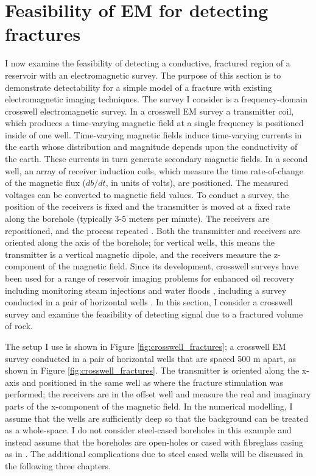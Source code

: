\section{Feasibility of EM for detecting fractures}
I now examine the feasibility of detecting a conductive, fractured region of a reservoir with an electromagnetic survey. The purpose of this section is to demonstrate detectability for a simple model of a fracture with existing electromagnetic imaging techniques. The survey I consider is a frequency-domain crosswell electromagnetic survey. In a crosswell EM survey a transmitter coil, which produces a time-varying magnetic field at a single frequency is positioned inside of one well. Time-varying magnetic fields induce time-varying currents in the earth whose distribution and magnitude depends upon the conductivity of the earth. These currents in turn generate secondary magnetic fields. In a second well, an array of receiver induction coils, which measure the time rate-of-change of the magnetic flux ($db/dt$, in units of volts), are positioned. The measured voltages can be converted to magnetic field values. To conduct a survey, the position of the receivers is fixed and the transmitter is moved at a fixed rate along the borehole (typically 3-5 meters per minute). The receivers are repositioned, and the process repeated \citep{Wilt1995}. Both the transmitter and receivers are oriented along the axis of the borehole; for vertical wells, this means the transmitter is a vertical magnetic dipole, and the receivers measure the z-component of the magnetic field. Since its development, crosswell surveys have been used for a range of reservoir imaging problems for enhanced oil recovery including monitoring steam injections \citep{Wilt1997} and water floods \citep{Wilt2012}, including a survey conducted in a pair of horizontal wells \citep{Marsala2015, Marsala2015a}. In this section, I consider a crosswell survey and examine the feasibility of detecting signal due to a fractured volume of rock.

The setup I use is shown in Figure \ref{fig:crosswell_fractures}; a crosswell EM survey conducted in a pair of horizontal wells that are spaced 500 m apart, as shown in Figure \ref{fig:crosswell_fractures}. The transmitter is oriented along the x-axis and positioned in the same well as where the fracture stimulation was performed; the receivers are in the offset well and measure the real and imaginary parts of the x-component of the magnetic field. In the numerical modelling, I assume that the wells are sufficiently deep so that the background can be treated as a whole-space. I do not consider steel-cased boreholes in this example and instead assume that the boreholes are open-holes or cased with fibreglass casing as in \cite{Wilt2012}. The additional complications due to steel cased wells will be discussed in the following three chapters.

